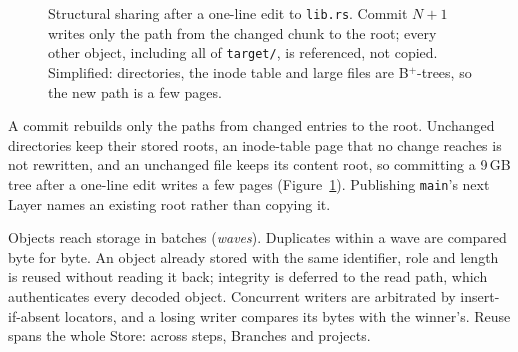 \documentclass[letterpaper,twocolumn,10pt]{article}
\begin{document}
\begin{figure}[t]
\centering
{}
\caption{Structural sharing after a one-line edit to \texttt{lib.rs}.
Commit $N{+}1$ writes only the path from the changed chunk to the root;
every other object, including all of \texttt{target/}, is referenced, not
copied. Simplified: directories, the inode table and large files are
B$^+$-trees, so the new path is a few pages.}
\label{fig:sharing}
\end{figure}

A commit rebuilds only the paths from changed entries to the root.
Unchanged directories keep their stored roots, an inode-table page that no
change reaches is not rewritten, and an unchanged file keeps its content
root, so committing a 9\,GB tree after a one-line edit writes a few pages
(Figure~\ref{fig:sharing}).
Publishing \texttt{main}'s next Layer names an existing root rather than
copying it.


Objects reach storage in batches (\emph{waves}). Duplicates within a wave
are compared byte for byte. An object already stored with the same
identifier, role and length is reused without reading it back; integrity is
deferred to the read path, which authenticates every decoded object.
Concurrent writers are arbitrated by insert-if-absent locators, and a losing
writer compares its bytes with the winner's. Reuse spans the whole Store:
across steps, Branches and projects.
\end{document}
